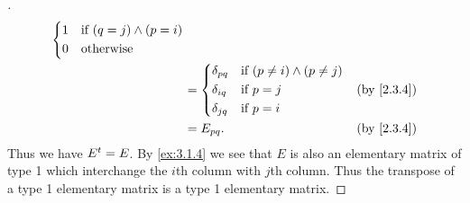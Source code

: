 \begin{proof}[]
\begin{align*}
\begin{dcases}
                                                                1 & \text{if } (q = j) \land (p = i)                     \\
                                                                0 & \text{otherwise}
                                                              \end{dcases}                  \\
                                                          & = \begin{dcases}
                                                                \delta_{p q} & \text{if } (p \neq i) \land (p \neq j) \\
                                                                \delta_{i q} & \text{if } p = j                       \\
                                                                \delta_{j q} & \text{if } p = i
                                                              \end{dcases}    &  & \by{2.3.4}                     \\
                                                          & = E_{p q}.                                                  &  & \by{2.3.4}
  \end{align*}
  Thus we have \({E}^{t} = E\).
  By \cref{ex:3.1.4} we see that \(E\) is also an elementary matrix of type 1 which interchange the \(i\)th column with \(j\)th column.
  Thus the transpose of a type 1 elementary matrix is a type 1 elementary matrix.


\end{proof}
